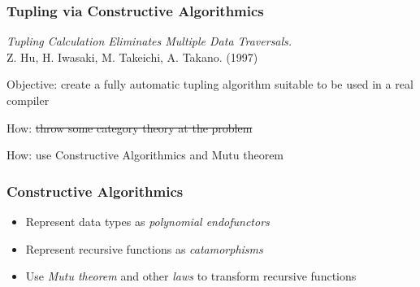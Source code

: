 \documentclass{beamer}
\begin{document}
\begin{frame}[t]
  \frametitle{Tupling via Constructive Algorithmics}
\textit{Tupling Calculation Eliminates Multiple Data Traversals.} \\Z. Hu, H. Iwasaki, M. Takeichi, A. Takano. (1997)

\vspace{0.6cm}

Objective: create a fully automatic tupling algorithm suitable to be used in a real compiler

\vspace{0.6cm}

How: \sout{throw some category theory at the problem}

\pause

\vspace{0.6cm}

How: use Constructive Algorithmics and Mutu theorem
\end{frame}

\begin{frame}[fragile]
  \frametitle{Constructive Algorithmics}
  \begin{itemize}
    \item Represent data types as \textit{polynomial endofunctors}
    \item Represent recursive functions as \textit{catamorphisms}
    \item Use \textit{Mutu theorem} and other \textit{laws} to transform recursive functions
  \end{itemize}
\end{frame}
\end{document}
